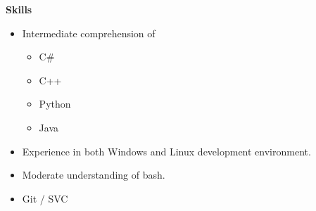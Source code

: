 \documentclass[12pt, letterpaper]{article}
\begin{document}
\begin{flushleft}
\textbf{\large Skills}
\begin{itemize}
	\item Intermediate comprehension of
	\begin{itemize}
		\item C\#
		\item C++
		\item Python
		\item Java
	\end{itemize}
	\item Experience in both Windows and Linux development environment.
	\item Moderate understanding of bash.
	\item Git / SVC
\end{itemize}

\end{flushleft}
	
\end{document}
